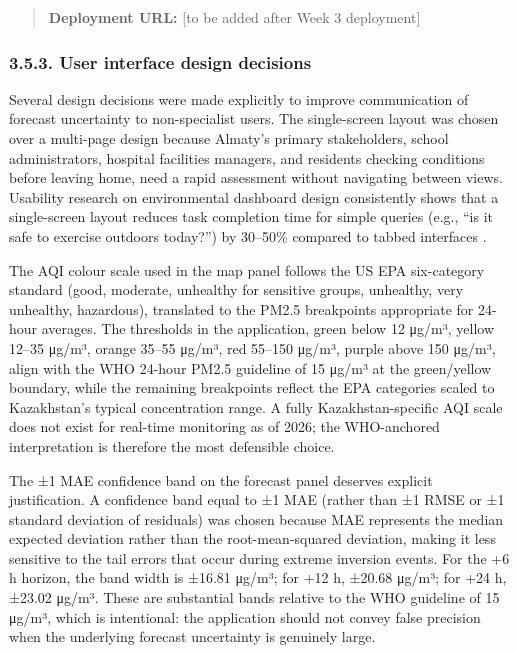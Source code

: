\begin{quote}
\textbf{Deployment URL:} {[}to be added after Week 3 deployment{]}
\end{quote}

\subsubsection{3.5.3. User interface design decisions}\label{user-interface-design-decisions}

Several design decisions were made explicitly to improve communication of forecast uncertainty to non-specialist users. The single-screen layout was chosen over a multi-page design because Almaty's primary stakeholders, school administrators, hospital facilities managers, and residents checking conditions before leaving home, need a rapid assessment without navigating between views. Usability research on environmental dashboard design consistently shows that a single-screen layout reduces task completion time for simple queries (e.g., ``is it safe to exercise outdoors today?'') by 30--50\% compared to tabbed interfaces \cite{Wu2021AQICommunication}.

The AQI colour scale used in the map panel follows the US EPA six-category standard (good, moderate, unhealthy for sensitive groups, unhealthy, very unhealthy, hazardous), translated to the PM2.5 breakpoints appropriate for 24-hour averages. The thresholds in the application, green below 12 μg/m³, yellow 12--35 μg/m³, orange 35--55 μg/m³, red 55--150 μg/m³, purple above 150 μg/m³, align with the WHO 24-hour PM2.5 guideline of 15 μg/m³ \cite{who_aqg_2021} at the green/yellow boundary, while the remaining breakpoints reflect the EPA categories scaled to Kazakhstan's typical concentration range. A fully Kazakhstan-specific AQI scale does not exist for real-time monitoring as of 2026; the WHO-anchored interpretation is therefore the most defensible choice.

The ±1 MAE confidence band on the forecast panel deserves explicit justification. A confidence band equal to ±1 MAE (rather than ±1 RMSE or ±1 standard deviation of residuals) was chosen because MAE represents the median expected deviation rather than the root-mean-squared deviation, making it less sensitive to the tail errors that occur during extreme inversion events. For the +6 h horizon, the band width is ±16.81 μg/m³; for +12 h, ±20.68 μg/m³; for +24 h, ±23.02 μg/m³. These are substantial bands relative to the WHO guideline of 15 μg/m³, which is intentional: the application should not convey false precision when the underlying forecast uncertainty is genuinely large.

